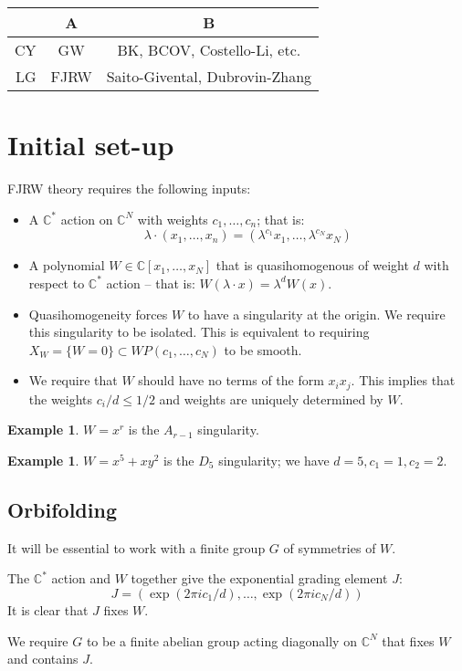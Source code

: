 \documentclass{amsart}
\theoremstyle{definition}
\newtheorem{example}[dummy]{Example}
\newcommand{\C}{\mathbb{C}}
\begin{document}
\begin{center}
\begin{tabular}{r|c|c}
 & A & B \\
\hline
CY & GW & BK, BCOV, Costello-Li, etc. \\
\hline
LG & FJRW & Saito-Givental, Dubrovin-Zhang
\end{tabular}
\end{center}

\section{Initial set-up}
FJRW theory requires the following inputs:
\begin{itemize}
\item A $\C^*$ action on $\C^N$ with weights $c_1,\dots, c_n$; that is:
$$\lambda\cdot(x_1,\dots, x_n)=(\lambda^{c_1}x_1,\dots, \lambda^{c_N}x_N)$$
\item A polynomial $W\in\C[x_1,\dots, x_N]$ that is quasihomogenous of weight $d$ with respect to $\C^*$ action -- that is: $W(\lambda\cdot x)=\lambda^d W(x)$.
\item Quasihomogeneity forces $W$ to have a singularity at the origin.
 We require this singularity to be isolated.  
This is equivalent to requiring $X_W=\{W=0\}\subset WP(c_1,\dots, c_N)$ to be smooth.
\item We require that $W$ should have no terms of the form $x_ix_j$.
 This implies that the weights $c_i/d\leq 1/2$ and weights are uniquely determined by $W$.
\end{itemize}

\begin{example}
$W=x^r$ is the $A_{r-1}$ singularity.
\end{example}

\begin{example}
$W=x^5+xy^2$ is the $D_5$ singularity; we have $d=5, c_1=1, c_2=2$.
\end{example}

\subsection{Orbifolding}
It will be essential to work with a finite group $G$ of symmetries of $W$.

The $\C^*$ action and $W$ together give the exponential grading element $J$: 
$$J=\left(\exp(2\pi i c_1/d), \dots, \exp(2\pi i c_N/d)\right)$$
It is clear that $J$ fixes $W$.

We require $G$ to be a finite abelian group acting diagonally on $\C^N$ that fixes $W$ and contains $J$.
\end{document}
